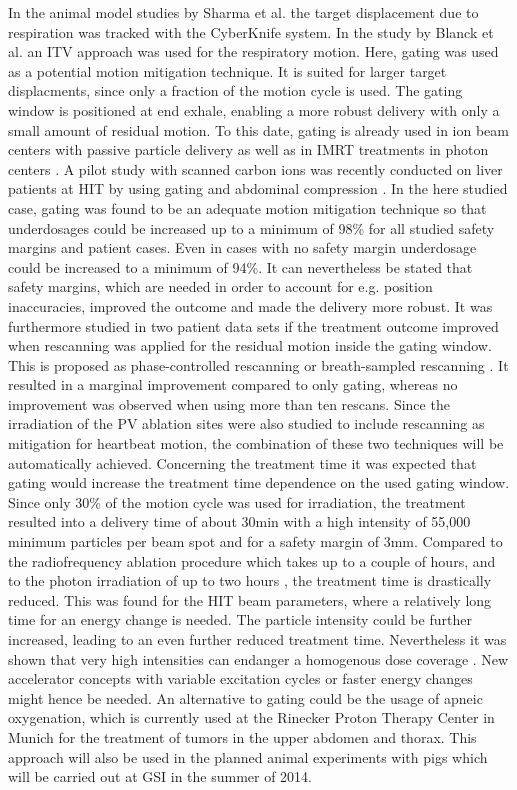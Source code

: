 In the animal model studies by Sharma et al. \cite{Sha10} the target displacement due to respiration was tracked with the CyberKnife 
system. In the study by Blanck et al. \cite{Bla13} an ITV approach was used for the respiratory motion. Here, gating was used as a potential 
motion mitigation technique. It is suited for larger target displacments, since only a fraction of the motion cycle is used. The gating window 
is positioned at end exhale, enabling a more robust delivery with only a small amount of residual motion. 
To this date, gating is already used in ion beam centers with passive particle delivery \cite{Min00} as well as in IMRT treatments 
in photon centers \cite{Kea06}. A pilot study with scanned carbon ions was recently conducted on liver patients at HIT by using gating and 
abdominal compression \cite{Ric12}. In the here studied case, gating was found to be an adequate motion mitigation technique so that underdosages could be increased up to 
a minimum of 98\% for all studied safety margins and patient cases. Even in cases with no safety margin underdosage could be increased to a 
minimum of 94\%. It can nevertheless be stated that safety margins, which are needed in order to account for e.g. position inaccuracies, 
improved the outcome and made the delivery more robust. It was furthermore studied in two patient data sets if the treatment outcome improved 
when rescanning was applied for the residual motion inside the gating window. This is proposed as phase-controlled rescanning \cite{Fur07} or 
breath-sampled rescanning \cite{Sec09}. It resulted in a marginal improvement compared to only gating, whereas no improvement was observed when 
using more than ten rescans. Since the irradiation of the PV ablation sites were also studied to include rescanning as mitigation for heartbeat motion, the 
combination of these two techniques will be automatically achieved. Concerning the treatment time it was expected that gating would increase the 
treatment time dependence on the used gating window. Since only 30\% of the motion cycle was used for irradiation, the treatment 
resulted into a delivery time of about 30min with a high intensity of 55,000 minimum particles per beam spot and for a safety margin of 3mm. 
Compared to the radiofrequency ablation procedure which takes up to a couple of hours, and to the photon irradiation of up to two hours 
\cite{Sha10}, the treatment time is drastically reduced. This was found for the HIT beam parameters, where a relatively long time for an 
energy change is needed. The particle intensity could be further increased, leading to an even further reduced treatment time. Nevertheless 
it was shown that very high intensities can endanger a homogenous dose coverage \cite{Mue14}. New accelerator concepts with variable 
excitation cycles \cite{Tsu08} or faster energy changes \cite{Iwa10} might hence be needed. 
An alternative to gating could be the usage of apneic oxygenation, which is currently used at the Rinecker Proton Therapy Center in Munich 
\cite{Ber11, RPTC12} for the treatment of tumors in the upper abdomen and thorax. This approach will also be used in the planned animal experiments 
with pigs which will be carried out at GSI in the summer of 2014. 

